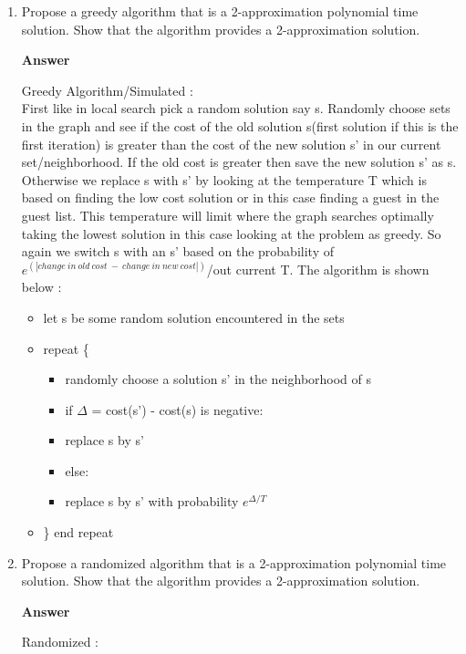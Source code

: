 \documentclass{article}
\begin{document}
\begin{enumerate}
\item Propose a greedy algorithm that is a  2-approximation
  polynomial time solution. Show that the algorithm provides a
  2-approximation solution.

\textbf{ Answer }
\vspace{0.1in}
\begin{adjustwidth}{1.8em}{0pt}
Greedy Algorithm/Simulated :\\

First like in local search pick a random solution say s. Randomly choose sets in the graph and see if the cost of the old solution s(first solution if this is the first iteration) is greater than the cost of the new solution s' in our current set/neighborhood. If the old cost is greater then save the new solution s' as s. Otherwise we replace s with s' by looking at the temperature T which is based on finding the low cost solution or in this case finding a guest in the guest list. This temperature will limit where the graph searches optimally taking the lowest solution in this case looking at the problem as greedy. So again we switch s with an s' based on the probability of $e^{(|change~in~old~cost~-~change~in~new~cost|)}$/out current T. The algorithm is shown below :
\begin{itemize}
\item let s be some random solution encountered in the sets
\item repeat \{
\begin{itemize}
\item randomly choose a solution s' in the neighborhood of s 
\item if $\Delta$ = cost(s') - cost(s) is negative:
\item replace s by s' 
\item else:   
\item replace s by s' with probability $e^{\Delta /T}$
\end{itemize}
\item \} end repeat
\end{itemize}
\end{adjustwidth}
\vspace{0.1in}

\item Propose a randomized algorithm that is a 2-approximation
  polynomial time solution. Show that the algorithm provides a
  2-approximation solution.

\textbf{ Answer }
\vspace{0.1in}
\begin{adjustwidth}{1.8em}{0pt}
Randomized :\\


\end{adjustwidth}
\end{enumerate}
\end{document}

